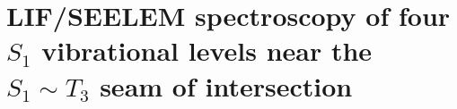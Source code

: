 \documentclass[12pt]{mitthesis}
\newcommand{\rcm}{cm$^{-1}$}
\newcommand{\e}[1]{\ensuremath{\times 10^{#1}}}
\newcommand{\degrees}{\ensuremath{^\circ}}
\begin{document}



\section{LIF/SEELEM spectroscopy of four $S_1$ vibrational levels near
  the $S_1 \sim T_3$ seam of intersection}

\end{document}
